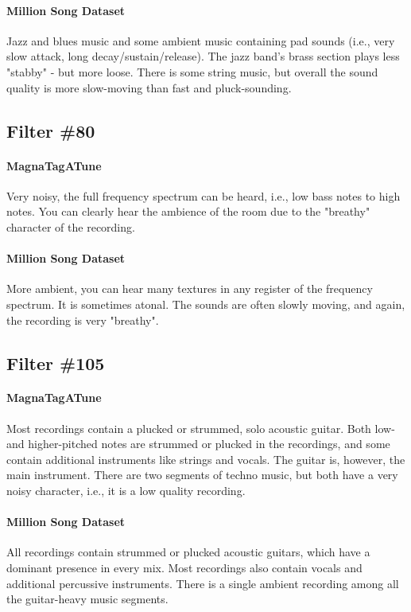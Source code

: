 \paragraph{Million Song Dataset}
Jazz and blues music and some ambient music containing pad sounds (i.e., very slow attack, long decay/sustain/release). The jazz band's brass section plays less "stabby" - but more loose. There is some string music, but overall the sound quality is more slow-moving than fast and pluck-sounding.


\subsection*{Filter \#80}
\paragraph{MagnaTagATune}
Very noisy, the full frequency spectrum can be heard, i.e., low bass notes to high notes. You can clearly hear the ambience of the room due to the "breathy" character of the recording.

\paragraph{Million Song Dataset}
More ambient, you can hear many textures in any register of the frequency spectrum. It is sometimes atonal. The sounds are often slowly moving, and again, the recording is very "breathy".


\subsection*{Filter \#105}
\paragraph{MagnaTagATune}
Most recordings contain a plucked or strummed, solo acoustic guitar. Both low- and higher-pitched notes are strummed or plucked in the recordings, and some contain additional instruments like strings and vocals. The guitar is, however, the main instrument. There are two segments of techno music, but both have a very noisy character, i.e., it is a low quality recording. 

\paragraph{Million Song Dataset}
All recordings contain strummed or plucked acoustic guitars, which have a dominant presence in every mix. Most recordings also contain vocals and additional percussive instruments. There is a single ambient recording among all the guitar-heavy music segments.


